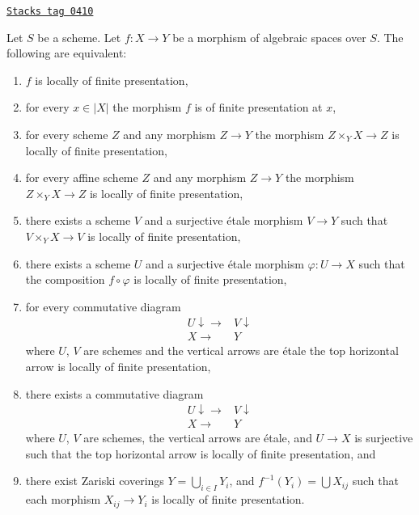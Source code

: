 \begin{lemma}
\label{spaces-morphisms-lemma-finite-presentation-local}
\href{https://stacks.math.columbia.edu/tag/0410}{\texttt{Stacks tag 0410}}

Let $S$ be a scheme.
Let $f : X \to Y$ be a morphism of algebraic spaces over $S$.
The following are equivalent:
\begin{enumerate}
\item $f$ is locally of finite presentation,
\item for every $x \in |X|$ the morphism $f$ is of finite presentation at $x$,
\item for every scheme $Z$ and any morphism $Z \to Y$ the morphism
$Z \times_Y X \to Z$ is locally of finite presentation,
\item for every affine scheme $Z$ and any morphism
$Z \to Y$ the morphism $Z \times_Y X \to Z$ is locally of finite presentation,
\item there exists a scheme $V$ and a surjective \'etale morphism
$V \to Y$ such that $V \times_Y X \to V$ is
locally of finite presentation,
\item there exists a scheme $U$ and a surjective \'etale morphism
$\varphi : U \to X$ such that the composition $f \circ \varphi$
is locally of finite presentation,
\item for every commutative diagram
$$
\begin{array}{cc}U \downarrow\longrightarrow & V \downarrow \\ X \longrightarrow & Y\end{array}
$$
where $U$, $V$ are schemes and the vertical arrows are \'etale
the top horizontal arrow is locally of finite presentation,
\item there exists a commutative diagram
$$
\begin{array}{cc}U \downarrow\longrightarrow & V \downarrow \\ X \longrightarrow & Y\end{array}
$$
where $U$, $V$ are schemes, the vertical arrows are \'etale, and
$U \to X$ is surjective such that the top horizontal arrow is
locally of finite presentation, and
\item there exist Zariski coverings $Y = \bigcup_{i \in I} Y_i$,
and $f^{-1}(Y_i) = \bigcup X_{ij}$ such that
each morphism $X_{ij} \to Y_i$ is locally of finite presentation.
\end{enumerate}
\end{lemma}

